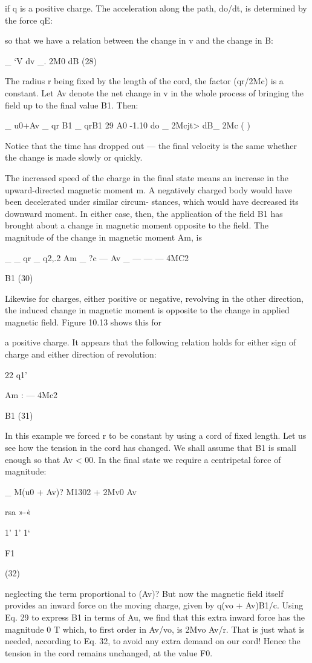 {{{if q is a positive charge. The acceleration along the path, do/dt, is
determined by the force qE:

so that we have a relation between the change in v and the change
in B:

_ ‘V
dv _. 2M0 dB (28)

The radius r being fixed by the length of the cord, the factor (qr/2Mc)
is a constant. Let Av denote the net change in v in the whole process
of bringing the field up to the final value B1. Then:

_ u0+Av _ qr B1 _ qrB1 29
A0 -1.10 do _ 2Mcjt> dB_ 2Mc ( )

Notice that the time has dropped out --- the final velocity is the same
whether the change is made slowly or quickly.

The increased speed of the charge in the final state means an increase
in the upward-directed magnetic moment m. A negatively
charged body would have been decelerated under similar circum-
stances, which would have decreased its downward moment. In
either case, then, the application of the field B1 has brought about
a change in magnetic moment opposite to the field. The magnitude
of the change in magnetic moment Am, is

_ _ qr _ q2,.2
Am _ ?c --- Av _  ---  ---  --- 4MC2

B1 (30)

Likewise for charges, either positive or negative, revolving in the
other direction, the induced change in magnetic moment is opposite
to the change in applied magnetic field. Figure 10.13 shows this for

 

a positive charge. It appears that the following relation holds for
either sign of charge and either direction of revolution:

22
q1'

Am :  ---  4Mc2

B1 (31)

In this example we forced r to be constant by using a cord of fixed
length. Let us see how the tension in the cord has changed. We
shall assume that B1 is small enough so that Av < 00. In the final
state we require a centripetal force of magnitude:

_ M(u0 + Av)? M1302 + 2Mv0 Av

rsa
»-\.«

1' 1' 1‘

F1

(32)

neglecting the term proportional to (Av)? But now the magnetic
field itself provides an inward force on the moving charge, given by
q(vo + Av)B1/c. Using Eq. 29 to express B1 in terms of Au, we find
that this extra inward force has the magnitude 0 T
which, to first order in Av/vo, is 2Mvo Av/r. That is just what is
needed, according to Eq. 32, to avoid any extra demand on our cord!
Hence the tension in the cord remains unchanged, at the value F0.

}}}
